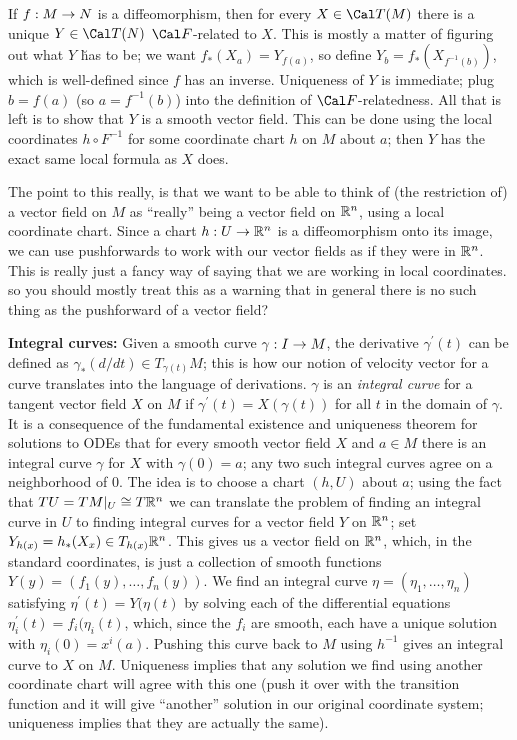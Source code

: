 \ssk

If $f:M\rightarrow N$ is a diffeomorphism, then for every $X\in {\Cal T}(M)$ there is a unique 
$Y\in {\Cal T}(N)$ ${\Cal F}$-related to $X$. This is mostly a matter of figuring out
what $Y$ \u{has} to be; we want $f_*(X_a)=Y_{f(a)}$, so define
$Y_b=f_*(X_{f^{-1}(b)})$, which is well-defined since $f$ has an inverse. Uniqueness of $Y$
is immediate; plug $b=f(a)$ (so $a=f^{-1}(b)$) into the definition of ${\Cal F}$-relatedness.
All that is left is to show that $Y$ is a smooth vector field. This can be done using the
local coordinates $h\circ F^{-1}$ for some coordinate chart $h$ on $M$ about $a$; then 
$Y$ has the exact same local formula as $X$ does. 

\ssk

The point to this really, is that we want to be able to think of (the restriction of) 
a vector field on $M$ as ``really'' being a vector field on ${\Bbb R}^n$, using a local
coordinate chart. Since a chart $h:U\rightarrow {\Bbb R}^n$ is a diffeomorphism onto its 
image, we can use pushforwards to work with our vector fields as if they were in ${\Bbb R}^n$.
This is really just a fancy way of saying that we are working in local coordinates.
so you should mostly treat this as a warning that in general there is no such thing
as the pushforward of a vector field?


\msk

{\bf Integral curves:} Given a smooth curve $\gamma:I\rightarrow M$, the derivative $\gamma^\prime(t)$
can be defined as $\gamma_*(d/dt)\in T_{\gamma(t)}M$; this is how our notion of velocity vector
for a curve translates into the language of derivations. $\gamma$ is an {\it integral curve}
for a tangent vector field $X$ on $M$ if $\gamma^\prime(t)=X(\gamma(t))$ for all
$t$ in the domain of $\gamma$. It is a consequence of the fundamental existence and uniqueness 
theorem for solutions to ODEs that for every smooth vector field $X$ and $a\in M$ there is
an integral curve $\gamma$ for $X$ with $\gamma(0)=a$; any two such integral curves agree
on a neighborhood of $0$. The idea is to choose a chart $(h,U)$ about $a$; using the fact 
that $TU=TM|_U\cong T{\Bbb R}^n$ we can translate the problem of finding an integral curve in $U$
to finding integral curves for a vector field $Y$ on ${\Bbb R}^n$; set $Y_{h(x)}=h_*(X_x)\in T_{h(x)}{\Bbb R}^n$.
This gives us a vector field on ${\Bbb R}^n$, which, in the standard coordinates, is just a collection of 
smooth functions $Y(y)=(f_1(y),\ldots ,f_n(y))$. We find an integral curve $\eta=(\eta_1,\ldots ,\eta_n)$ satisfying 
$\eta^\prime(t)=Y(\eta(t)$ by solving each of the differential equations $\eta_i^\prime(t)=f_i(\eta_i(t)$,
which, since the $f_i$ are smooth, each have a unique solution with $\eta_i(0)=x^i(a)$.
Pushing this curve back to $M$ using $h^{-1}$ gives an integral curve to $X$ on $M$.
Uniqueness implies that any solution we find using another coordinate chart will agree with this one
(push it over with the transition function and it will give ``another'' solution in our original
coordinate system; uniqueness implies that they are actually the same). 

